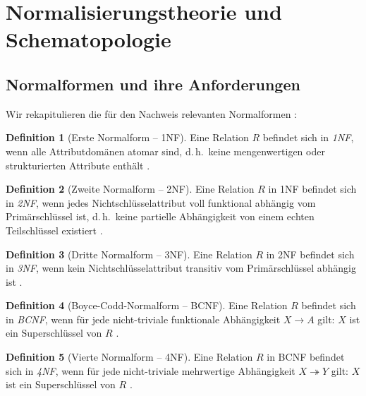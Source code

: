 ﻿\documentclass[12pt,a4paper]{article}
\theoremstyle{definition}
\newtheorem{definition}{Definition}[section]
\theoremstyle{remark}
\begin{document}
\section{Normalisierungstheorie und Schematopologie}
\label{sec:normalformen}

\subsection{Normalformen und ihre Anforderungen}

Wir rekapitulieren die für den Nachweis relevanten Normalformen \cite{Codd1974, Fagin1977}:

\begin{definition}[Erste Normalform -- 1NF]
Eine Relation $R$ befindet sich in \emph{1NF}, wenn alle Attributdomänen
atomar sind, d.\,h.\ keine mengenwertigen oder strukturierten Attribute
enthält \cite{Codd1970}.
\end{definition}

\begin{definition}[Zweite Normalform -- 2NF]
Eine Relation $R$ in 1NF befindet sich in \emph{2NF}, wenn jedes
Nichtschlüsselattribut voll funktional abhängig vom Primärschlüssel ist,
d.\,h.\ keine partielle Abhängigkeit von einem echten Teilschlüssel existiert
\cite{Codd1974}.
\end{definition}

\begin{definition}[Dritte Normalform -- 3NF]
Eine Relation $R$ in 2NF befindet sich in \emph{3NF}, wenn kein
Nichtschlüsselattribut transitiv vom Primärschlüssel abhängig ist
\cite{Codd1974}.
\end{definition}

\begin{definition}[Boyce-Codd-Normalform -- BCNF]
Eine Relation $R$ befindet sich in \emph{BCNF}, wenn für jede
nicht-triviale funktionale Abhängigkeit $X \to A$ gilt: $X$ ist ein
Superschlüssel von $R$ \cite{Boyce1974}.
\end{definition}

\begin{definition}[Vierte Normalform -- 4NF]
Eine Relation $R$ in BCNF befindet sich in \emph{4NF}, wenn für jede
nicht-triviale mehrwertige Abhängigkeit $X \twoheadrightarrow Y$ gilt:
$X$ ist ein Superschlüssel von $R$ \cite{Fagin1977}.
\end{definition}
\end{document}
